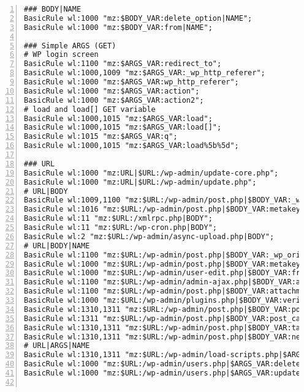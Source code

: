 \documentclass[Configuration]{subfiles}
\begin{document}
\begin{lstlisting}[frame=single,caption=Wordpress whitelist rules,backgroundcolor=\color{gray},breaklines=true,numbers=left,]
### BODY|NAME
BasicRule wl:1000 "mz:$BODY_VAR:delete_option|NAME";
BasicRule wl:1000 "mz:$BODY_VAR:from|NAME";

### Simple ARGS (GET)
# WP login screen
BasicRule wl:1100 "mz:$ARGS_VAR:redirect_to";
BasicRule wl:1000,1009 "mz:$ARGS_VAR:_wp_http_referer";
BasicRule wl:1000 "mz:$ARGS_VAR:wp_http_referer";
BasicRule wl:1000 "mz:$ARGS_VAR:action";
BasicRule wl:1000 "mz:$ARGS_VAR:action2";
# load and load[] GET variable
BasicRule wl:1000,1015 "mz:$ARGS_VAR:load";
BasicRule wl:1000,1015 "mz:$ARGS_VAR:load[]";
BasicRule wl:1015 "mz:$ARGS_VAR:q";
BasicRule wl:1000,1015 "mz:$ARGS_VAR:load%5b%5d";

### URL
BasicRule wl:1000 "mz:URL|$URL:/wp-admin/update-core.php";
BasicRule wl:1000 "mz:URL|$URL:/wp-admin/update.php";
# URL|BODY
BasicRule wl:1009,1100 "mz:$URL:/wp-admin/post.php|$BODY_VAR:_wp_http_referer";
BasicRule wl:1016 "mz:$URL:/wp-admin/post.php|$BODY_VAR:metakeyselect";
BasicRule wl:11 "mz:$URL:/xmlrpc.php|BODY";
BasicRule wl:11 "mz:$URL:/wp-cron.php|BODY";
BasicRule wl:2 "mz:$URL:/wp-admin/async-upload.php|BODY";
# URL|BODY|NAME
BasicRule wl:1100 "mz:$URL:/wp-admin/post.php|$BODY_VAR:_wp_original_http_referer|NAME";
BasicRule wl:1000 "mz:$URL:/wp-admin/post.php|$BODY_VAR:metakeyselect|NAME";
BasicRule wl:1000 "mz:$URL:/wp-admin/user-edit.php|$BODY_VAR:from|NAME";
BasicRule wl:1100 "mz:$URL:/wp-admin/admin-ajax.php|$BODY_VAR:attachment%5burl%5d|NAME";
BasicRule wl:1100 "mz:$URL:/wp-admin/post.php|$BODY_VAR:attachment_url|NAME";
BasicRule wl:1000 "mz:$URL:/wp-admin/plugins.php|$BODY_VAR:verify-delete|NAME";
BasicRule wl:1310,1311 "mz:$URL:/wp-admin/post.php|$BODY_VAR:post_category[]|NAME";
BasicRule wl:1311 "mz:$URL:/wp-admin/post.php|$BODY_VAR:post_category|NAME";
BasicRule wl:1310,1311 "mz:$URL:/wp-admin/post.php|$BODY_VAR:tax_input[post_tag]|NAME";
BasicRule wl:1310,1311 "mz:$URL:/wp-admin/post.php|$BODY_VAR:newtag[post_tag]|NAME";
# URL|ARGS|NAME
BasicRule wl:1310,1311 "mz:$URL:/wp-admin/load-scripts.php|$ARGS_VAR:load[]|NAME";
BasicRule wl:1000 "mz:$URL:/wp-admin/users.php|$ARGS_VAR:delete_count|NAME";
BasicRule wl:1000 "mz:$URL:/wp-admin/users.php|$ARGS_VAR:update|NAME";


\end{lstlisting}
\end{document}
